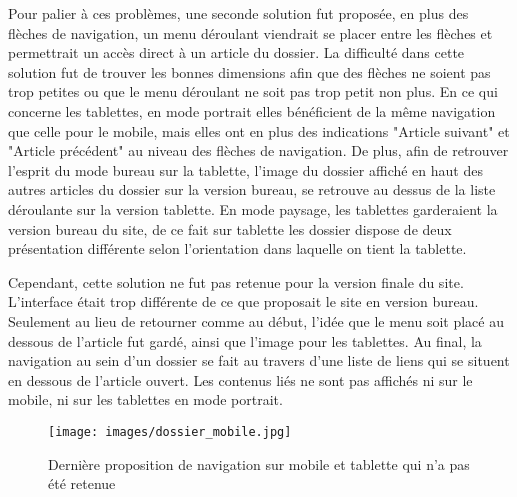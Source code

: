 \documentclass[12pt,a4paper]{article}
\begin{document}
Pour palier à ces problèmes, une seconde solution fut proposée, en plus des flèches de navigation, un menu déroulant viendrait se placer entre les flèches et permettrait un accès direct à un article du dossier. La difficulté dans cette solution fut de trouver les bonnes dimensions afin que des flèches ne soient pas trop petites ou que le menu déroulant ne soit pas trop petit non plus. En ce qui concerne les tablettes, en mode portrait elles bénéficient de la même navigation que celle pour le mobile, mais elles ont en plus des indications "Article suivant" et "Article précédent" au niveau des flèches de navigation. De plus, afin de retrouver l'esprit du mode bureau sur la tablette, l'image du dossier affiché en haut des autres articles du dossier sur la version bureau, se retrouve au dessus de la liste déroulante sur la version tablette. En mode paysage, les tablettes garderaient la version bureau du site, de ce fait sur tablette les dossier dispose de deux présentation différente selon l'orientation dans laquelle on tient la tablette.\par
Cependant, cette solution ne fut pas retenue pour la version finale du site. L'interface était trop différente de ce que proposait le site en version bureau. Seulement au lieu de retourner comme au début, l'idée que le menu soit placé au dessous de l'article fut gardé, ainsi que l'image pour les tablettes. Au final, la navigation au sein d'un dossier se fait au travers d'une liste de liens qui se situent en dessous de l'article ouvert. Les contenus liés ne sont pas affichés ni sur le mobile, ni sur les tablettes en mode portrait.\par

\begin{figure}[h!]
\centering\texttt{[image: images/dossier\_mobile.jpg]} 
\caption{Dernière proposition de navigation sur mobile et tablette qui n'a pas été retenue}
\end{figure}
\newpage
\end{document}
